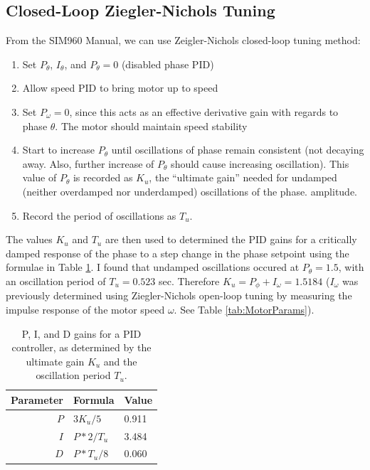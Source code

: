 \documentclass[11pt]{article} %
\begin{document}
\subsection{Closed-Loop Ziegler-Nichols Tuning}

From the SIM960 Manual, we can use Zeigler-Nichols closed-loop tuning method:
\begin{enumerate}
\item Set $P_\theta$, $I_\theta$, and $P_\theta = 0$ (disabled phase PID)
\item Allow speed PID to bring motor up to speed
\item Set $P_\omega = 0$, since this acts as an effective derivative gain with regards to phase $\theta$. The motor should maintain speed stability
\item Start to increase $P_\theta$ until oscillations of phase remain consistent (not decaying away. Also, further increase of $P_\theta$ should cause increasing oscillation). This value of $P_\theta$ is recorded as $K_u$, the ``ultimate gain'' needed for undamped (neither overdamped nor underdamped) oscillations of the phase.  amplitude. 
\item Record the period of oscillations as $T_u$.
\end{enumerate}

\noindent The values $K_u$ and $T_u$ are then used to determined the PID gains for a critically damped response of the phase to a step change in the phase setpoint using the formulae in Table \ref{tab:ZieglerNichols}. I found that undamped oscillations occured at $P_\theta = 1.5$, with an oscillation period of $T_u = 0.523$ sec. Therefore $K_u = P_\phi + I_\omega = 1.5184$ ($I_\omega$ was previously determined using Ziegler-Nichols open-loop tuning by measuring the impulse response of the motor speed $\omega$. See Table \ref{tab:MotorParams}).
\begin{table}[h]
\centering
\begin{tabular}{ r | l | l }
\hline
\textbf{Parameter} & \textbf{Formula} & \textbf{Value}  \\
\hline
$P$ & $3 K_u/5$ & 0.911\\
$I$ & $P*2/T_u$ & 3.484\\
$D$ & $P*T_u/8$ & 0.060
\end{tabular}
\caption{P, I, and D gains for a PID controller, as determined by the ultimate gain $K_u$ and the oscillation period $T_u$.}
\label{tab:ZieglerNichols}
\end{table}
\end{document}
